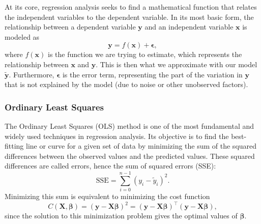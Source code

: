 \documentclass[aps,pra,english,notitlepage,reprint,nofootinbib]{revtex4-1}  %
\begin{document}
At its core, regression analysis seeks to find a mathematical function that relates the independent variables to the dependent variable. In its most basic form, the relationship between a dependent variable $\mathbf{y}$ and an independent variable $\mathbf{x}$ is modeled as
\begin{equation}
  \mathbf{y} = f(\mathbf{x}) + \boldsymbol{\epsilon},
\end{equation}
where $f(\mathbf{x})$ is the function we are trying to estimate, which represents the relationship between $\mathbf{x}$ and $\mathbf{y}$. This is then what we approximate with our model $\mathbf{\tilde{y}}$. Furthermore, $\boldsymbol{\epsilon}$ is the error term, representing the part of the variation in $\mathbf{y}$ that is not explained by the model (due to noise or other unobserved factors). 

\subsubsection{Ordinary Least Squares}\label{subsubsec:ols}
The Ordinary Least Squares (OLS) method is one of the most fundamental and widely used techniques in regression analysis. Its objective is to find the best-fitting line or curve for a given set of data by minimizing the sum of the squared differences between the observed values and the predicted values. These squared differences are called errors, hence the sum of squared errors (SSE):
\begin{equation}
\text{SSE} = \sum_{i=0}^{n-1} \left( y_i - \tilde{y}_i \right)^2.
\end{equation}
Minimizing this sum is equivalent to minimizing the cost function
\begin{equation}
C(\mathbf{X},\boldsymbol{\beta}) = \left(\mathbf{y}-\mathbf{X}\boldsymbol{\beta} \right)^2 = (\mathbf{y} - \mathbf{X} \boldsymbol{\beta})^\top (\mathbf{y} - \mathbf{X} \boldsymbol{\beta}), \label{eq:OLS cost}
\end{equation}
since the solution to this minimization problem gives the optimal values of $\boldsymbol{\beta}$.
\end{document}
